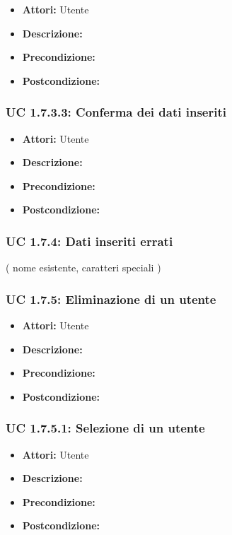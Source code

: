 \begin{itemize}
\item \textbf{Attori:} Utente
\item \textbf{Descrizione:} 
\item \textbf{Precondizione:} 
\item \textbf{Postcondizione:} 
\end{itemize}

\subsubsection{UC 1.7.3.3: Conferma dei dati inseriti}

\begin{itemize}
\item \textbf{Attori:} Utente
\item \textbf{Descrizione:} 
\item \textbf{Precondizione:} 
\item \textbf{Postcondizione:} 
\end{itemize}

\subsubsection{UC 1.7.4: Dati inseriti errati}
( nome esistente, caratteri speciali )
\subsubsection{UC 1.7.5: Eliminazione di un utente}

\begin{itemize}
\item \textbf{Attori:} Utente
\item \textbf{Descrizione:} 
\item \textbf{Precondizione:} 
\item \textbf{Postcondizione:} 
\end{itemize}

\subsubsection{UC 1.7.5.1: Selezione di un utente}

\begin{itemize}
\item \textbf{Attori:} Utente
\item \textbf{Descrizione:} 
\item \textbf{Precondizione:} 
\item \textbf{Postcondizione:} 
\end{itemize}


